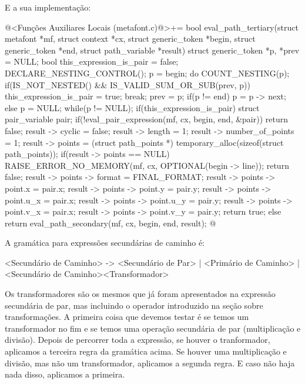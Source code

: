 {{{{{{E a sua implementação:

\iniciocodigo
@<Funções Auxiliares Locais (metafont.c)@>+=
bool eval_path_tertiary(struct metafont *mf, struct context *cx,
                        struct generic_token *begin,
                        struct generic_token *end,
                        struct path_variable *result){
  struct generic_token *p, *prev = NULL;
  bool this_expression_is_pair = false;
  DECLARE_NESTING_CONTROL();
  p = begin;
  do{
    COUNT_NESTING(p);
    if(IS_NOT_NESTED() && IS_VALID_SUM_OR_SUB(prev, p)){
      this_expression_is_pair = true;
      break;
    }
    prev = p;
    if(p != end)
      p = p -> next;
    else
      p = NULL;
  }while(p != NULL);
  if(this_expression_is_pair){
    struct pair_variable pair;
    if(!eval_pair_expression(mf, cx, begin, end, &pair))
      return false;
    result -> cyclic = false;
    result -> length = 1;
    result -> number_of_points = 1;
    result -> points = (struct path_points *)
                         temporary_alloc(sizeof(struct path_points));
    if(result -> points == NULL){
      RAISE_ERROR_NO_MEMORY(mf, cx, OPTIONAL(begin -> line));
      return false;
    }
    result -> points -> format = FINAL_FORMAT;
    result -> points -> point.x = pair.x;
    result -> points -> point.y = pair.y;
    result -> points -> point.u_x = pair.x;
    result -> points -> point.u_y = pair.y;
    result -> points -> point.v_x = pair.x;
    result -> points -> point.v_y = pair.y;
    return true;
  }
  else
    return eval_path_secondary(mf, cx, begin, end, result);
}
@
\fimcodigo


A gramática para expressões secundárias de caminho é:

\alinhaverbatim
<Secundário de Caminho> -> <Secundário de Par> | <Primário de Caminho> |
                           <Secundário de Caminho><Transformador>
\alinhanormal

Os transformadores são os mesmos que já foram apresentados na
expressão secundária de par, mas incluindo o
operador  introduzido na seção sobre
transformações. A primeira coisa que devemos testar é se temos um
transformador no fim e se temos uma operação secundária de par
(multiplicação e divisão). Depois de percorrer toda a expressão, se
houver o tranformador, aplicamos a terceira regra da gramática
acima. Se houver uma multiplicação e divisão, mas não um
transformador, aplicamos a segunda regra. E caso não haja nada disso,
aplicamos a primeira.

}}}}}}
